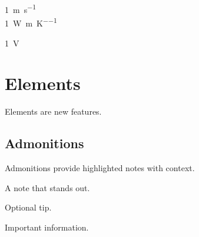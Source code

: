 \documentclass[11pt,titlepage]{article}
\begin{document}
\begin{example}
\qty{1}{\metre\per\second} \\
\qty{1}{\watt\per\metre\per\kelvin}
\end{example}

\begin{example}
\qty{1}{\volt\rms}
\end{example}


\section{Elements}

Elements are new features.


\subsection{Admonitions}

Admonitions provide highlighted notes with context.

\begin{example}
\begin{note}
  A note that stands out.
\end{note}
\end{example}

\begin{example}
\begin{tip}
  Optional tip.
\end{tip}
\end{example}

\begin{example}
\begin{important}
  Important information.
\end{important}
\end{example}
\end{document}
